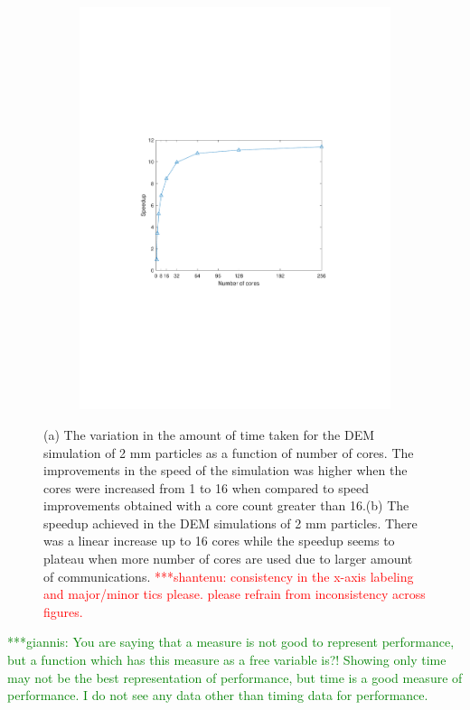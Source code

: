 \documentclass[preprint,11pt,authoryear]{elsarticle}
\newcommand{\jhanote}[1]{ {\textcolor{red} { ***shantenu: #1 }}}
\newcommand{\gpnote}[1]{{\textcolor{green} {***giannis: #1}}}
\newcommand{\jhanote}[1]{ {\textcolor{red} { ***shantenu: #1 }}}
\newcommand{\gpnote}[1]{}
\begin{document}
\begin{figure}
\begin{subfigure}{.45\textwidth}
\includegraphics[scale=0.6]{rslsts_2mm_DEM_speedup_mtlb.pdf}
\caption{}
\label{fig:rslts_DEM_speedup}
\end{subfigure}
\caption{(a) The variation in the amount of time taken for the DEM simulation of 2 mm particles as 
a function of number of cores. The improvements in the speed of the simulation was higher when the 
cores were increased from 1 to 16 when compared to speed improvements obtained with a core count greater 
than 16.(b) The speedup achieved in the DEM simulations of 2 mm particles. There 
was a linear increase up to 16 cores while the speedup seems to plateau when 
more number of cores are used due to larger amount of communications.
\jhanote{consistency in the x-axis labeling and major/minor tics please. please refrain from inconsistency across figures.}}
\end{figure} 


\gpnote{You are saying that a measure is not good to represent performance, but a function which has
this measure as a free variable is?! Showing only time may not be the best representation of performance,
but time is a good measure of performance. I do not see any data other than timing data for performance.}
\end{document}
